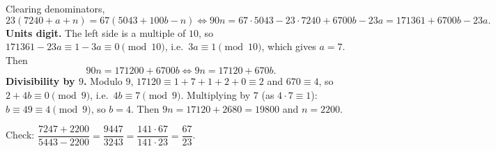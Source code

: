 Clearing denominators,
\[
23(7240+a+n)=67(5043+100b-n)\iff 90n=67\cdot5043-23\cdot7240+6700b-23a=171361+6700b-23a .
\]
\textbf{Units digit.} The left side is a multiple of $10$, so $171361-23a\equiv1-3a\equiv0\pmod{10}$, i.e.\ $3a\equiv1\pmod{10}$, which gives $a=7$. Then
\[
90n=171200+6700b\iff 9n=17120+670b .
\]
\textbf{Divisibility by $9$.} Modulo $9$, $17120\equiv1+7+1+2+0\equiv2$ and $670\equiv4$, so $2+4b\equiv0\pmod9$, i.e.\ $4b\equiv7\pmod9$. Multiplying by $7$ (as $4\cdot7\equiv1$): $b\equiv49\equiv4\pmod9$, so $b=4$. Then $9n=17120+2680=19800$ and $n=\boxed{2200}$.

Check: $\dfrac{7247+2200}{5443-2200}=\dfrac{9447}{3243}=\dfrac{141\cdot67}{141\cdot23}=\dfrac{67}{23}$.
